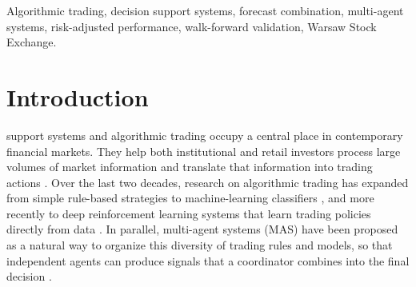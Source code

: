 \documentclass{ieeeaccess}
\begin{document}
\begin{keywords}
Algorithmic trading, decision support systems, forecast combination, multi-agent systems, risk-adjusted performance, walk-forward validation, Warsaw Stock Exchange.
\end{keywords}

\titlepgskip=-21pt

\maketitle

\section{Introduction}
\label{sec:introduction}
 support systems and algorithmic trading occupy a central place in contemporary financial markets. They help both institutional and retail investors process large volumes of market information and translate that information into trading actions \cite{hendershott_does_2011}. Over the last two decades, research on algorithmic trading has expanded from simple rule-based strategies \cite{brock1992} to machine-learning classifiers \cite{gerlein2016,fischerkrauss2018}, and more recently to deep reinforcement learning systems that learn trading policies directly from data \cite{huang2022,shavandi2022,kaursingh2023}. In parallel, multi-agent systems (MAS) have been proposed as a natural way to organize this diversity of trading rules and models, so that independent agents can produce signals that a coordinator combines into the final decision \cite{luo2002,korczak2013,hernes2016,hernes2024}.
\end{document}
